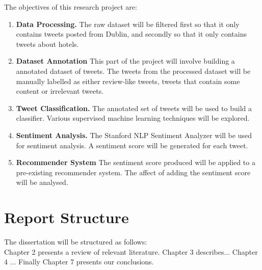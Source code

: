 The objectives of this research project are:
\begin{enumerate}
    \item \textbf{Data Processing.}\newline
    The raw dataset will be filtered first so that it only contains tweets posted from Dublin, and secondly so that it only contains tweets about hotels.
    \item \textbf{Dataset Annotation} \newline
    This part of the project will involve building a annotated dataset of tweets. The tweets from the processed dataset will be manually labelled as either review-like tweets, tweets that contain some content or irrelevant tweets.
    \item \textbf{Tweet Classification.}\newline
    The annotated set of tweets will be used to build a classifier. Various supervised machine learning techniques will be explored.
    \item \textbf{Sentiment Analysis.}\newline
    The Stanford NLP Sentiment Analyzer \cite{stanfordSentiment2013} will be used for sentiment analysis. A sentiment score will be generated for each tweet.
    \item \textbf{Recommender System}\newline
    The sentiment score produced will be applied to a pre-existing recommender system. The affect of adding the sentiment score will be analysed.
\end{enumerate}

\section{Report Structure}
The dissertation will be structured as follows:\\
Chapter 2 presents a review of relevant literature. Chapter 3 describes... Chapter 4 ... Finally Chapter 7 presents our conclusions.